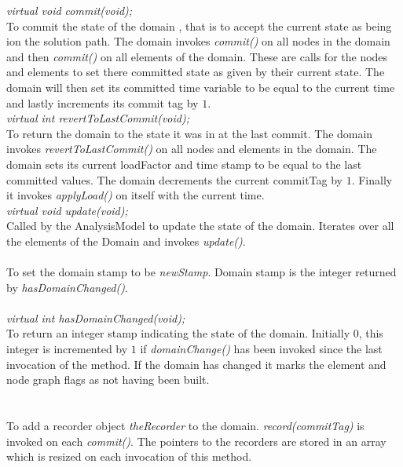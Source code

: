 {\em virtual void commit(void);} \\
To commit the state of the domain , that is to accept the current
state as being ion the solution path. The domain invokes {\em
commit()} on all nodes in the domain and then {\em 
commit()} on all elements of the domain. These are calls for the nodes
and elements to set there committed state as given by their current
state. The domain will then set its committed time variable to be
equal to the current time and lastly increments its commit tag by $1$. \\ 


{\em virtual int revertToLastCommit(void);} \\
To return the domain to the state it was in at the last commit. The
domain invokes {\em revertToLastCommit()} on all nodes and elements in
the domain. The domain sets its current loadFactor and time
stamp to be equal to the last committed values. The domain decrements
the current commitTag by $1$. Finally it invokes {\em applyLoad()}
on itself with the current time.\\

{\em virtual void update(void);} \\
Called by the AnalysisModel to update the state of the
domain. Iterates over all the elements of the Domain and invokes {\em
update()}. \\

\\
To set the domain stamp to be {\em newStamp}. Domain stamp is the
integer returned by {\em hasDomainChanged()}. \\

 \\
{\em virtual int hasDomainChanged(void);} \\
To return an integer stamp indicating the state of the
domain. Initially $0$, this integer is incremented by $1$ if  {\em
domainChange()} has been invoked since the last invocation of the
method. If the domain has changed it marks the element and node graph
flags as not having been built.\\  

 \\
\\
To add a recorder object {\em theRecorder} to the domain. {\em
record(commitTag)} is invoked on each {\em commit()}. The pointers to
the recorders are stored in an array which is resized on each
invocation of this method.\\  

